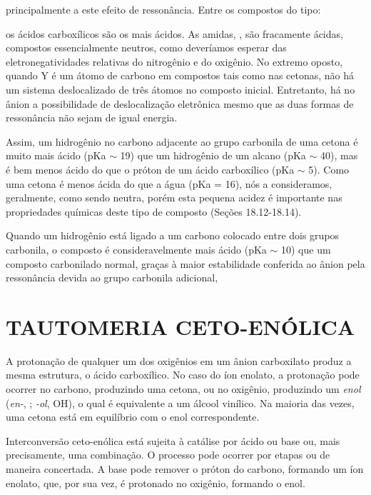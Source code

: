 \noindent principalmente a este efeito de ressonância.
\noindent Entre os compostos do tipo:

\noindent os ácidos carboxílicos são os mais ácidos. As amidas, , são fracamente ácidas, compostos essencialmente neutros, como deveríamos esperar das eletronegatividades relativas do nitrogênio e do oxigênio. No extremo oposto, quando Y é um átomo de carbono em compostos tais como nas cetonas, não há um sistema deslocalizado de três átomos no composto inicial. Entretanto, há no ânion a possibilidade de deslocalização eletrônica mesmo que as duas formas de ressonância não sejam de igual energia.



Assim, um hidrogênio no carbono adjacente ao grupo carbonila de uma cetona é muito mais ácido (pKa $\sim$ 19) que um hidrogênio de um alcano (pKa $\sim$ 40), mas é bem menos ácido do que o próton de um ácido carboxílico (pKa $\sim$ 5). Como uma cetona é menos ácida do que a água (pKa = 16), nós a consideramos, geralmente, como sendo neutra, porém esta pequena acidez é importante nas propriedades químicas deste tipo de composto (Seções 18.12-18.14).

Quando um hidrogênio está ligado a um carbono colocado entre dois grupos carbonila, o composto é consideravelmente mais ácido (pKa $\sim$ 10) que um composto carbonilado normal, graças à maior estabilidade conferida ao ânion pela ressonância devida ao grupo carbonila adicional,



\section{TAUTOMERIA CETO-ENÓLICA}

A protonação de qualquer um dos oxigênios em um ânion carboxilato produz a mesma estrutura, o ácido carboxílico. No caso do íon enolato, a protonação pode ocorrer no carbono, produzindo uma cetona, ou no oxigênio, produzindo um \textit{enol} (\textit{en-}, ; \textit{-ol}, OH), o qual é equivalente a um álcool vinílico. Na maioria das vezes, uma cetona está em equilíbrio com o enol correspondente.



\noindent Interconversão ceto-enólica está sujeita à catálise por ácido ou base ou, mais precisamente, uma combinação. O processo pode ocorrer por etapas ou de maneira concertada. A base pode remover o próton do carbono, formando um íon enolato, que, por sua vez, é protonado no oxigênio, formando o enol.

